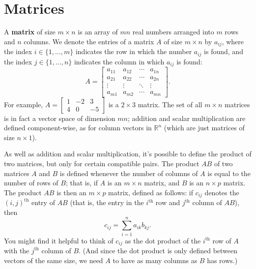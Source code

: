 \documentclass[12pt,letterpaper]{article}
\newcommand{\R}{\mathbb{R}}
\newcommand{\di}{\displaystyle}
\begin{document}
\section{Matrices}
A {\bf matrix} of size $m\times n$ is an array of $mn$ real numbers arranged into $m$ rows and $n$ columns. We denote the entries of a matrix $A$ of size $m\times n$ by $a_{ij}$, where the index $i\in\{1,\ldots, m\}$ indicates the row in which the number $a_{ij}$ is found, and the index $j\in\{1,\ldots, n\}$ indicates the column in which $a_{ij}$ is found:
\[
A = \begin{bmatrix}
a_{11} & a_{12} & \cdots & a_{1n}\\
a_{21} & a_{22} & \cdots & a_{2n}\\
\vdots & \vdots & \ddots & \vdots\\
a_{m1} & a_{m2} & \cdots & a_{mn}
\end{bmatrix}.
\]
For example, $\di A = \begin{bmatrix} 1&-2&3\\4&0&-5\end{bmatrix}$ is a $2\times 3$ matrix. The set of all $m\times n$ matrices is in fact a vector space of dimension $mn$; addition and scalar multiplication are defined component-wise, as for column vectors in $\R^n$ (which are just matrices of size $n\times 1$).

As well as addition and scalar multiplication, it's possible to define the product of two matrices, but only for certain compatible pairs. The product $AB$ of two matrices $A$ and $B$ is defined whenever the number of columns of $A$ is equal to the number of rows of $B$; that is, if $A$ is an $m\times n$ matrix, and $B$ is an $n\times p$ matrix. The product $AB$ is then an $m\times p$ matrix, defined as follows: if $c_{ij}$ denotes the $(i,j)^{\mathrm{th}}$ entry of $AB$ (that is, the entry in the $i^{\mathrm{th}}$ row and $j^{\mathrm{th}}$ column of $AB$), then
\[
c_{ij} = \sum_{i=1}^n a_{ik}b_{kj}.
\]
You might find it helpful to think of $c_{ij}$ as the dot product of the $i^{\mathrm{th}}$ row of $A$ with the $j^{\mathrm{th}}$ column of $B$. (And since the dot product is only defined between vectors of the same size, we need $A$ to have as many columns as $B$ has rows.)
\end{document}
